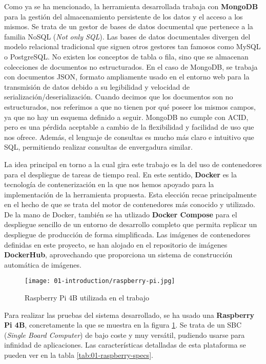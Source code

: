 Como ya se ha mencionado, la herramienta desarrollada trabaja con
\textbf{MongoDB} para la gestión del almacenamiento persistente de los datos y
el acceso a los mismos. Se trata de un gestor de bases de datos documental que
pertenece a la familia NoSQL (\textit{Not only SQL}). Las bases de datos
documentales divergen del modelo relacional tradicional que siguen otros
gestores tan famosos como MySQL o PostgreSQL. No existen los conceptos de tabla
o fila, sino que se almacenan colecciones de documentos no estructurados. En el
caso de MongoDB, se trabaja con documentos JSON, formato ampliamente usado en el
entorno web para la transmisión de datos debido a su legibilidad y velocidad de
serialización/deserialización. Cuando decimos que los documentos son no
estructurados, nos referimos a que no tienen por qué poseer los mismos campos,
ya que no hay un esquema definido a seguir. MongoDB no cumple con ACID, pero es
una pérdida aceptable a cambio de la flexibilidad y facilidad de uso que nos
ofrece. Además, el lenguaje de consultas es mucho más claro e intuitivo que SQL,
permitiendo realizar consultas de envergadura similar.

La idea principal en torno a la cual gira este trabajo es la del uso de
contenedores para el despliegue de tareas de tiempo real. En este sentido,
\textbf{Docker} es la tecnología de contenerización en la que nos hemos apoyado
para la implementación de la herramienta propuesta. Esta elección recae
principalmente en el hecho de que se trata del motor de contenedores más
conocido y utilizado. De la mano de Docker, también se ha utlizado
\textbf{Docker Compose} para el despliegue sencillo de un entorno de desarrollo
completo que permita replicar un despliegue de producción de forma simplificada.
Las imágenes de contenedores definidas en este proyecto, se han alojado en el
repositorio de imágenes \textbf{DockerHub}, aprovechando que proporciona un
sistema de construcción automática de imágenes.

\begin{figure}
      \centering
      \texttt{[image: 01-introduction/raspberry-pi.jpg]}
      \caption{Raspberry Pi 4B utilizada en el trabajo}
      \label{fig:01-raspberry-pi}
\end{figure}

Para realizar las pruebas del sistema desarrollado, se ha usado una
\textbf{Raspberry Pi 4B}, concretamente la que se muestra en la figura
\ref{fig:01-raspberry-pi}. Se trata de un SBC (\textit{Single Board Computer})
de bajo coste y muy versátil, pudiendo usarse para infinidad de aplicaciones.
Las características detalladas de esta plataforma se pueden ver en la tabla \ref{tab:01-raspberry-specs}.

